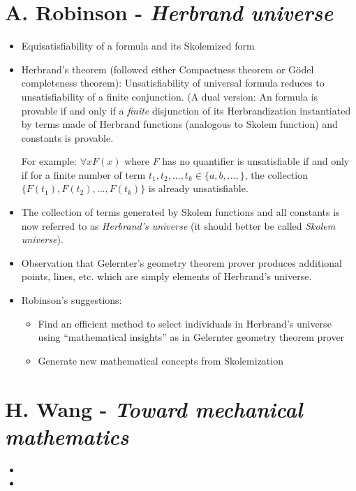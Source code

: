 \documentclass{article}
\begin{document}
\section{A. Robinson - \emph{Herbrand universe}}

\begin{itemize}
\item Equisatisfiability of a formula and its Skolemized form
\item Herbrand's theorem (followed either Compactness theorem or G\"odel completeness theorem): Unsatisfiability of universal formula reduces to unsatisfiability of a finite conjunction. (A dual version: An formula is provable if and only if a \emph{finite} disjunction of its Herbrandization instantiated by terms made of Herbrand functions (analogous to Skolem function) and constants is provable.

For example: $\forall x F(x)$ where $F$ has no quantifier is unsatisfiable if and only if for a finite number of term $t_1, t_2, ..., t_k \in \{a, b, ..., \}$, the collection $\{F(t_1), F(t_2), ..., F(t_k)\}$ is already unsatisfiable.
\item The collection of terms generated by Skolem functions and all constants is now referred to as \emph{Herbrand's universe}  (it should better be called \emph{Skolem universe}).
\item Observation that Gelernter's geometry theorem prover produces additional points, lines, etc. which are simply elements of Herbrand's universe.
\item Robinson's suggestions:
\begin{itemize}
\item Find an efficient method to select individuals in Herbrand's universe using ``mathematical insights'' as in Gelernter geometry theorem prover
\item Generate new mathematical concepts from Skolemization
\end{itemize}
\end{itemize}

\section{H. Wang - \emph{Toward mechanical mathematics}}

\begin{itemize}
\item 
\item 
\end{itemize}
\end{document}
